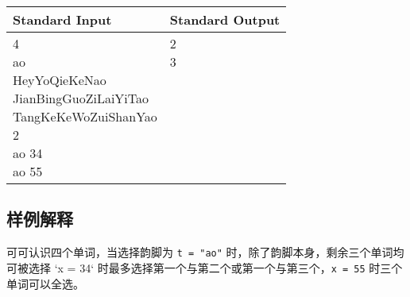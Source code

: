 \begin{table}[H]
\begin{tabularx}{\textwidth}{|X|X|}
    \hline
    \textbf{Standard Input} & \textbf{Standard Output} \\ 
    \hline 
    \tablecell{
        4 \\
        ao \\
        HeyYoQieKeNao \\
        JianBingGuoZiLaiYiTao \\
        TangKeKeWoZuiShanYao \\
        2 \\
        ao 34 \\
        ao 55 \\
    } & 
    \tablecell{
        2 \\
        3 \\ \\ \\ \\ \\ \\ \\
    } \\
    \hline
\end{tabularx}
\end{table}
\subsection*{样例解释}
可可认识四个单词，当选择韵脚为 \lstinline{t = "ao"} 时，除了韵脚本身，剩余三个单词均可被选择 `x = 34` 时最多选择第一个与第二个或第一个与第三个，\lstinline{x = 55} 时三个单词可以全选。